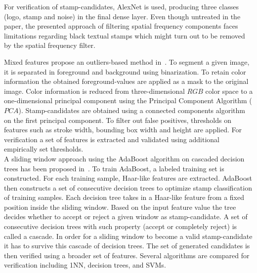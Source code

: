 \begin{description}
\begin{enumerate*}[label={\alph*)},font={\color{red!50!black}\bfseries}]
        For verification of stamp-candidates, AlexNet is used, producing three
        classes (logo, stamp and noise) in the final \gls{dense layer}. Even 
        though untreated in the paper, the presented approach of filtering 
        spatial frequency components faces limitations regarding black textual 
        stamps which might turn out to be removed by the spatial frequency 
        filter.\\
        \item [Mixed features]
        \citeauthor*{Dey.16.12.201519.12.2015} propose an outliers-based
        method in~\cite{Dey.16.12.201519.12.2015}. To segment a given image,
        it is separated in foreground and background using binarization. To
        retain color information the obtained foreground-values are applied as
        a mask to the original image. Color information is reduced from
        three-dimensional \(RGB\) color space to a one-dimensional principal
        component using the Principal Component Algorithm (\(PCA\)).
        Stamp-candidates are obtained using a connected components algorithm on
        the first principal component. To filter out false positives,
        thresholds on features such as stroke width, bounding box width and
        height are applied. For verification a set of features is extracted and
        validated using additional empirically set thresholds.\\

        A sliding window approach using the AdaBoost algorithm on cascaded
        decision trees has been proposed in~\cite{Forczmanski.2016}. To train 
        AdaBoost, a labeled training set is constructed. For each training 
        sample, Haar-like features are extracted. AdaBoost then constructs a 
        set of consecutive decision trees to optimize stamp classification of 
        training samples. Each decision tree takes in a Haar-like feature from 
        a fixed position inside the sliding window. Based on the input feature 
        value the tree decides whether to accept or reject a given window as 
        stamp-candidate. A set of consecutive decision trees with such property 
        (accept or completely reject) is called a cascade. In order for a 
        sliding window to become a valid stamp-candidate it has to survive this 
        cascade of decision trees. The set of generated candidates is then 
        verified using a broader set of features. Several algorithms are 
        compared for verification including 1NN, decision trees, and SVMs.\\


\end{enumerate*}
\end{description}
